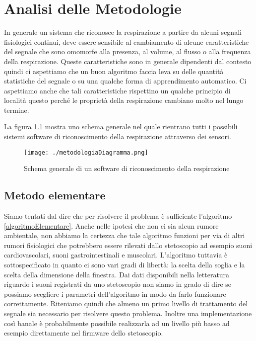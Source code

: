 \chapter{Analisi delle Metodologie}


In generale un sistema che riconosce la respirazione a partire da alcuni segnali fisiologici continui, deve essere sensibile al cambiamento di alcune caratteristiche del segnale che sono omomorfe alla presenza, al volume, al flusso o alla frequenza della respirazione. 
Queste caratteristiche sono in generale dipendenti dal contesto quindi ci aspettiamo che un buon algoritmo faccia leva su delle quantit\`a statistiche del segnale o su una qualche forma di apprendimento automatico. 
Ci aspettiamo anche che tali caratteristiche rispettino un qualche principio di localit\`a questo perch\'e le propriet\`a della respirazione cambiano molto nel lungo termine.

La figura \ref{schemaGeneraleAlg} mostra uno schema generale nel quale rientrano tutti i possibili sistemi software di riconoscimento della respirazione attraverso dei sensori.
\begin{figure}[!b]
 \centering
 \texttt{[image: ./metodologiaDiagramma.png]}
  \caption{Schema generale di un software di riconoscimento della respirazione}
  \label{schemaGeneraleAlg}
\end{figure}


\section{Metodo elementare}
Siamo tentati dal dire che per risolvere il problema \`e sufficiente l'algoritmo \ref{algoritmoElementare}. 
Anche nelle ipotesi che non ci sia alcun rumore ambientale, non abbiamo la certezza che tale algoritmo funzioni per via di altri rumori fisiologici che potrebbero essere rilevati dallo stetoscopio ad esempio suoni cardiovascolari, suoni gastrointestinali e muscolari. 
L'algoritmo tuttavia \`e sottospecificato in quanto ci sono vari gradi di libert\`a: la scelta della soglia e la scelta della dimensione della finestra. 
Dai dati disponibili nella letteratura riguardo i suoni registrati da uno stetoscopio non siamo in grado di dire se possiamo scegliere i parametri dell'algoritmo in modo da farlo funzionare correttamente.
Riteniamo quindi che almeno un primo livello di trattamento del segnale sia necessario per risolvere questo problema. 
Inoltre una implementazione cos\`i banale \`e probabilmente possibile realizzarla ad un livello pi\`u basso ad esempio direttamente nel firmware dello stetoscopio. 

